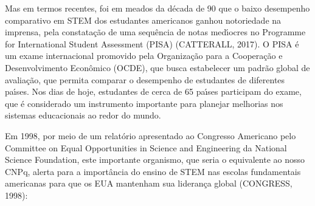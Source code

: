 \documentclass[
12pt,		%
openright,	%
twoside,  %
a4paper,			%
chapter=TITLE,		%
english,			%
french,				%
spanish,			%
brazil				%
]{USPSC-classe/USPSC}
\begin{document}
\noindent\begin{center}\mbox{\centering{}}\end{center}


Mas em termos recentes, foi em meados da d\'ecada de 90 que o baixo desempenho comparativo em STEM dos estudantes americanos ganhou notoriedade na imprensa, pela constata\c{c}\~ao de uma sequ\^encia de notas med\'{\i}ocres no Programme for International Student Assessment (PISA)  (CATTERALL, 2017). O PISA \'e um exame internacional promovido pela Organiza\c{c}\~ao para a Coopera\c{c}\~ao e Desenvolvimento Econ\^omico (OCDE), que busca estabelecer um padr\~ao global de avalia\c{c}\~ao, que permita comparar o desempenho de estudantes de diferentes pa\'{\i}ses. Nos dias de hoje, estudantes de cerca de 65 pa\'{\i}ses participam do exame, que \'e considerado um instrumento importante para planejar melhorias nos sistemas educacionais ao redor do mundo.










Em 1998, por meio de um relat\'orio apresentado ao Congresso Americano pelo Committee on Equal Opportunities in Science and Engineering da National Science Foundation, este importante organismo, que seria o equivalente ao nosso CNPq, alerta para a import\^ancia do ensino de STEM nas escolas fundamentais americanas para que os EUA mantenham sua lideran\c{c}a global  (CONGRESS, 1998):











\noindent\begin{center}\mbox{\centering{}}\end{center}
\end{document}
